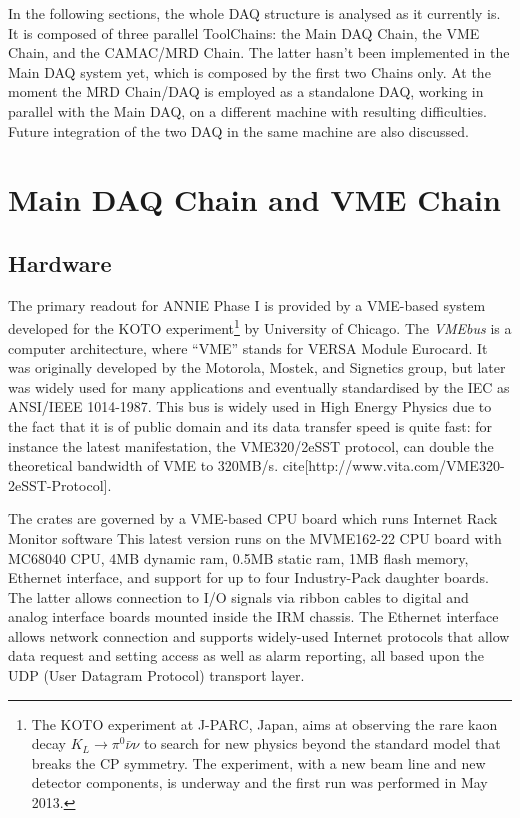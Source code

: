 In the following sections, the whole DAQ structure is analysed as it currently is.
It is composed of three parallel ToolChains: the Main DAQ Chain, the VME Chain, and %
the CAMAC/MRD Chain.
The latter hasn't been implemented in the Main DAQ system yet, which is composed by the %
first two Chains only.
At the moment the MRD Chain/DAQ is employed as a standalone DAQ, working in parallel %
with the Main DAQ, on a different machine with resulting difficulties.
Future integration of the two DAQ in the same machine are also discussed.

\section{Main DAQ Chain and VME Chain}
\label{sec:3.1}

\subsection{Hardware}

The primary readout for ANNIE Phase I is provided by a VME-based system developed for the KOTO %
experiment\footnote{The KOTO experiment at J-PARC, Japan, aims at observing the rare kaon decay %
  $K_L\rightarrow \pi^0 \bar{\nu} \nu$ to search for new physics beyond the standard model that %
  breaks the CP symmetry. The experiment, with a new beam line and new detector components, is %
  underway and the first run was performed in May 2013.} %
by University of Chicago.
The \emph{VMEbus} is a computer architecture, where ``VME'' stands for VERSA Module Eurocard.
It was originally developed by the Motorola, Mostek, and Signetics group, but later was widely %
used for many applications and eventually standardised by the IEC as ANSI/IEEE 1014-1987.
This bus is widely used in High Energy Physics due to the fact that it is of public domain and %
its data transfer speed is quite fast: for instance the latest manifestation, %
the VME320/2eSST protocol, can double the theoretical bandwidth of VME to 320MB/s.
cite[http://www.vita.com/VME320-2eSST-Protocol].

The crates are governed by a VME-based CPU board which runs Internet Rack Monitor software
This latest version runs on the MVME162-22 CPU board with MC68040 CPU, 4MB dynamic ram, %
0.5MB static ram, 1MB flash memory, Ethernet interface, and support for up to four %
Industry-Pack daughter boards. 
The latter allows connection to I/O signals via ribbon cables to digital and %
analog interface boards mounted inside the IRM chassis. 
The Ethernet interface allows network connection and supports widely-used %
Internet protocols that allow data request and setting access as well as alarm reporting, %
all based upon the UDP (User Datagram Protocol) transport layer.

